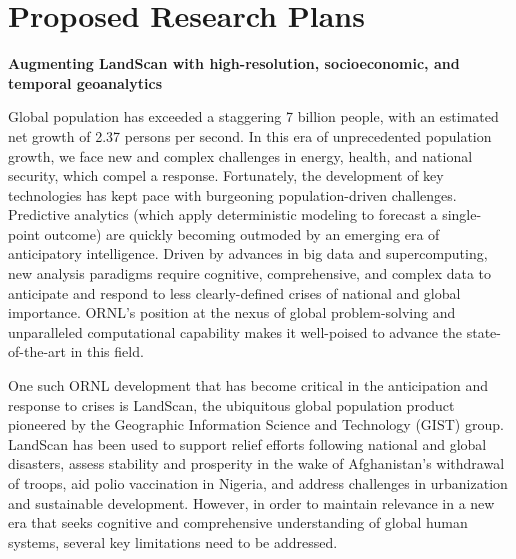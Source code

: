 \documentclass[11pt,letterpaper,sans]{moderncv}
\begin{document}
\section{Proposed Research Plans}

\textbf{Augmenting LandScan with high-resolution, socioeconomic, and temporal geoanalytics}

Global population has exceeded a staggering 7 billion people, with an estimated net growth of 2.37 persons per second. In this era of unprecedented population growth, we face new and complex challenges in energy, health, and national security, which compel a response.  
Fortunately, the development of key technologies has kept pace with burgeoning population-driven challenges. Predictive analytics (which apply deterministic modeling to forecast a single-point outcome) are quickly becoming outmoded by an emerging era of anticipatory intelligence. Driven by advances in big data and supercomputing, new analysis paradigms require cognitive, comprehensive, and complex data to anticipate and respond to less clearly-defined crises of national and global importance. ORNL's position at the nexus of global problem-solving and unparalleled computational capability makes it well-poised to advance the state-of-the-art in this field. 
\newline

One such ORNL development that has become critical in the anticipation and response to crises is LandScan, the ubiquitous global population product pioneered by the Geographic Information Science and Technology (GIST) group. LandScan has been used to support relief efforts following national and global disasters, assess stability and prosperity in the wake of Afghanistan's withdrawal of troops, aid polio vaccination in Nigeria, and address challenges in urbanization and sustainable development. However, in order to maintain relevance in a new era that seeks cognitive and comprehensive understanding of global human systems, several key limitations need to be addressed. 
\newline 
\end{document}
